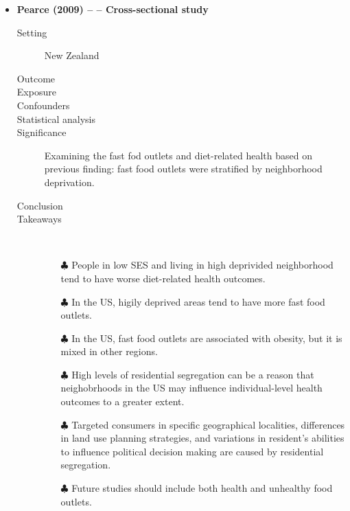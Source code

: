 \documentclass{article}
\begin{document}
\begin{itemize}
		\item {\bf Pearce (2009) -- -- Cross-sectional study}
				\begin{description}
						\item[Setting] New Zealand
						\item[Outcome]
						\item[Exposure]
						\item[Confounders]
						\item[Statistical analysis]
						\item[Significance] Examining the fast fod outlets and diet-related health based on previous finding: fast food outlets were stratified by neighborhood deprivation.
						\item[Conclusion]
    	         		\item[Takeaways] \mbox{}\\ 
    			        	\begin{itemize}
									\item[$\clubsuit$] People in low SES and living in high deprivided neighborhood tend to have worse diet-related health outcomes.
									\item[$\clubsuit$] In the US, higily deprived areas tend to have more fast food outlets.
									\item[$\clubsuit$] In the US, fast food outlets are associated with obesity, but it is mixed in other regions.
									\item[$\clubsuit$] High levels of residential segregation can be a reason that neighobrhoods in the US may influence individual-level health outcomes to a greater extent.  
									\item[$\clubsuit$] Targeted consumers in specific geographical localities, differences in land use planning strategies, and variations in resident's abilities to influence political decision making are caused by residential segregation.
									\item[$\clubsuit$] Future studies should include both health and unhealthy food outlets. 
							\end{itemize}
			    \end{description}


\end{itemize}
\end{document}
